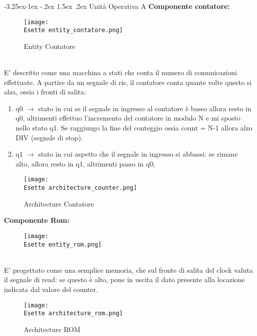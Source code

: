 \documentclass[12pt]{article}
\makeatletter
\renewcommand\subsubsection{\@startsection{subsubsection}{3}{\z@}%
            {-3.25ex\@plus -1ex \@minus -.2ex}%
            {1.5ex \@plus .2ex}%
            {\normalfont\large\bfseries}}
\def \Esette {Allegati/Esercizio7/}
\makeatother
\begin{document}
\subsubsection{Unità Operativa A}
{\large \textbf{Componente contatore:}}
\begin{figure}[ht!]
    \centering
    \texttt{[image: \\Esette entity\_contatore.png]}
    \caption{Entity Contatore}
\end{figure}
\\E' descritto come una macchina a stati che conta il numero di comunicazioni effettuate. A partire da un segnale di ris, il contatore conta quante volte questo si alza, ossia i fronti di salita:
\begin{enumerate}
    \item q0 $\rightarrow$ stato in cui se il segnale in ingresso al contatore è basso allora resto in q0, altrimenti effettuo l'incremento del contatore in modulo N e mi sposto nello stato q1. Se raggiungo la fine del conteggio ossia count = N-1 allora alzo DIV (segnale di stop).
    \item q1 $\rightarrow$ stato in cui aspetto che il segnale in ingresso si abbassi: se rimane alto, allora resto in q1, altrimenti passo in q0;
\end{enumerate}
\begin{figure}[ht!]
    \centering
    \texttt{[image: \\Esette architecture\_counter.png]}
    \caption{Architecture Contatore}
\end{figure}
\clearpage
{\large \textbf{Componente Rom:}}
\begin{figure}[ht]
    \centering
    \texttt{[image: \\Esette entity\_rom.png]}
\end{figure}
\\E' progettato come una semplice memoria, che sul fronte di salita del clock valuta il segnale di read: se questo è alto, pone in uscita il dato presente alla locazione indicata dal valore del counter.
\begin{figure}[ht!]
    \centering
    \texttt{[image: \\Esette architecture\_rom.png]}
    \caption{Architecture ROM}
\end{figure}
\clearpage
\end{document}
